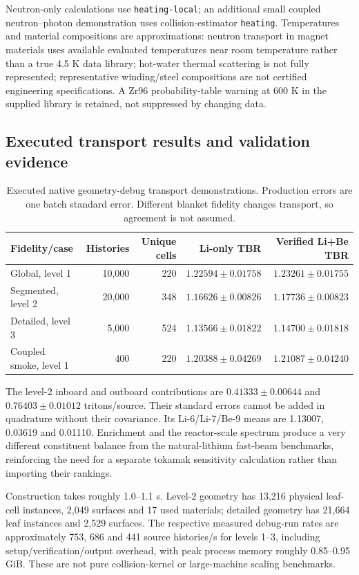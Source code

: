 Neutron-only calculations use \texttt{heating-local}; an additional small coupled neutron--photon demonstration uses collision-estimator \texttt{heating}. Temperatures and material compositions are approximations: neutron transport in magnet materials uses available evaluated temperatures near room temperature rather than a true 4.5 K data library; hot-water thermal scattering is not fully represented; representative winding/steel compositions are not certified engineering specifications. A Zr96 probability-table warning at 600 K in the supplied library is retained, not suppressed by changing data.

\subsection{Executed transport results and validation evidence}
\begin{table}[tbp]\centering\small
\caption{Executed native geometry-debug transport demonstrations. Production errors are one batch standard error. Different blanket fidelity changes transport, so agreement is not assumed.}
\begin{tabular}{lrrrr}
\toprule Fidelity/case & Histories & Unique cells & Li-only TBR & Verified Li+Be TBR\\\midrule
Global, level 1 & 10,000 & 220 & $1.22594\pm0.01758$ & $1.23261\pm0.01755$\\
Segmented, level 2 & 20,000 & 348 & $1.16626\pm0.00826$ & $1.17736\pm0.00823$\\
Detailed, level 3 & 5,000 & 524 & $1.13566\pm0.01822$ & $1.14700\pm0.01818$\\
Coupled smoke, level 1 & 400 & 220 & $1.20388\pm0.04269$ & $1.21087\pm0.04240$\\
\bottomrule
\end{tabular}\end{table}
The level-2 inboard and outboard contributions are $0.41333\pm0.00644$ and $0.76403\pm0.01012$ tritons/source. Their standard errors cannot be added in quadrature without their covariance. Its Li-6/Li-7/Be-9 means are 1.13007, 0.03619 and 0.01110. Enrichment and the reactor-scale spectrum produce a very different constituent balance from the natural-lithium fast-beam benchmarks, reinforcing the need for a separate tokamak sensitivity calculation rather than importing their rankings.

Construction takes roughly 1.0--1.1 s. Level-2 geometry has 13,216 physical leaf-cell instances, 2,049 surfaces and 17 used materials; detailed geometry has 21,664 leaf instances and 2,529 surfaces. The respective measured debug-run rates are approximately 753, 686 and 441 source histories/s for levels 1--3, including setup/verification/output overhead, with peak process memory roughly 0.85--0.95 GiB. These are not pure collision-kernel or large-machine scaling benchmarks.

